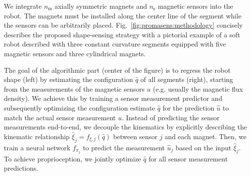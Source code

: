 We integrate $n_\mathrm{m}$ axially symmetric magnets and $n_\mathrm{s}$ magnetic sensors into the robot. The magnets must be installed along the center line of the segment while the sensors can be arbitrarily placed.
%
%
Fig.~\ref{fig:promasens:methodology} concisely describes the proposed shape-sensing strategy with a pictorial example of a soft robot described with three constant curvature segments equipped with five magnetic sensors and three cylindrical magnets.
%

The goal of the algorithmic part (center of the figure) is to regress the robot shape (left) by estimating the configuration $\hat{q}$ of all segments (right),
starting from the measurements of the magnetic sensors $u$ (e.g. usually the magnetic flux density).
We achieve this by training a sensor measurement predictor and subsequently optimizing the configuration estimate $\hat{q}$ for the prediction $\hat{u}$ to match the actual sensor measurement $u$.
Instead of predicting the sensor measurements end-to-end, we decouple the kinematics by explicitly describing the kinematic relationship $\hat{\xi}_j = f_{\xi,j}(\hat{q})$ between sensor $j$ and each magnet. %
Then, we train a neural network $f_{\pi_j}$ to predict the measurement $\hat{u}_j$ based on the input $\hat{\xi}_j$.
To achieve proprioception, we jointly optimize $\hat{q}$ for all sensor measurement predictions. %


